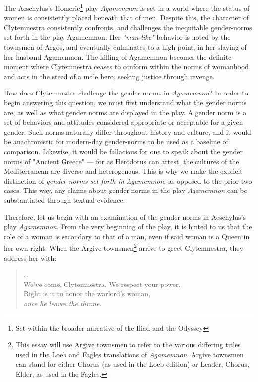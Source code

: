 
The Aeschylus's Homeric\footnote{Set within the broader narrative of the Iliad
and the Odyssey} play \emph{Agamemnon} is set in a world where the status of
women is consistently placed beneath that of men. Despite this, the character of
Clytemnestra consistently confronts, and challenges the inequitable gender-norms
set forth in the play Agamemnon. Her \emph{"man-like"} behavior is noted by the
townsmen of Argos, and eventually culminates to a high point, in her slaying of
her husband Agamemnon. The killing of Agamemnon becomes the definite moment
where Clytemnestra ceases to conform within the norms of womanhood, and acts in
the stead of a male hero, seeking justice through revenge.

How does Clytemnestra challenge the gender norms in \emph{Agamemnon}? In order
to begin answering this question, we must first understand what the gender norms
are, as well as what gender norms are displayed in the play. A gender norm is a
set of behaviors and attitudes considered appropriate or acceptable for a given
gender. Such norms naturally differ throughout history and culture, and it
would be anachronistic for modern-day gender-norms to be used as a baseline
of comparison. Likewise, it would be fallacious for one to speak about the
gender norms of "Ancient Greece" --- for as Herodotus can attest, the cultures
of the Mediterranean are diverse and heterogenous. This is why we make the
explicit distinction of \emph{gender norms set forth in Agamemnon}, as opposed
to the prior two cases. This way, any claims about gender norms in the play
\emph{Agamemnon} can be substantiated through textual evidence.

Therefore, let us begin with an examination of the gender norms in Aeschylus's
play \emph{Agamemnon}. From the very beginning of the play, it is hinted to us
that the role of a woman is secondary to that of a man, even if said woman is a
Queen in her own right. When the Argive townsmen\footnote{This essay
will use Argive townsmen to refer to the various differing titles used in the
Loeb and Fagles translations of \emph{Agamemnon}. Argive townsmen can stand for
either Chorus (as used in the Loeb edition) or Leader, Chorus, Elder, as used in
the Fagles.} arrive to greet Clytemnestra, they address her with:

\begin{quote}
    \ldots\ \\
    We've come, Clytemnestra. We respect your power. \\
    Right is it to honor the warlord's woman, \\
    \textit{once he leaves the throne}. \\
    \autocite[258]{fagles}
\end{quote}

